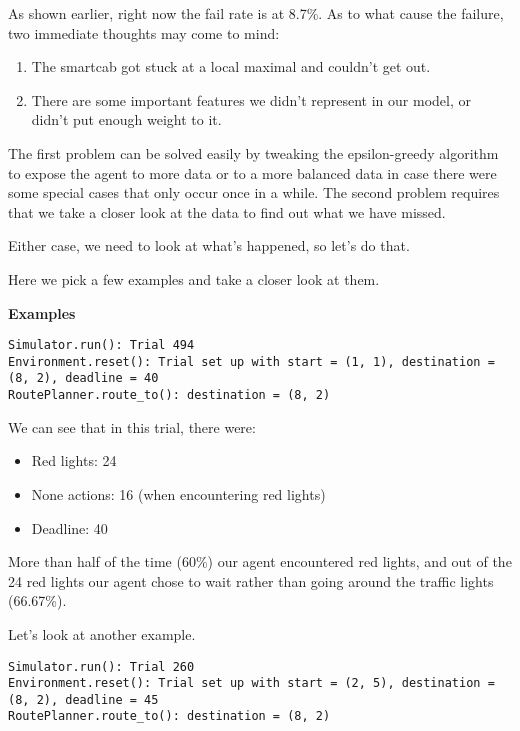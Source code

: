 \documentclass{article}
\providecommand{\tightlist}{%
      \setlength{\itemsep}{0pt}\setlength{\parskip}{0pt}}
\begin{document}
As shown earlier, right now the fail rate is at 8.7\%. As to what cause
the failure, two immediate thoughts may come to mind:

\begin{enumerate}
\def\labelenumi{\arabic{enumi}.}
\item
  The smartcab got stuck at a local maximal and couldn't get out.
\item
  There are some important features we didn't represent in our model, or
  didn't put enough weight to it.
\end{enumerate}

The first problem can be solved easily by tweaking the epsilon-greedy
algorithm to expose the agent to more data or to a more balanced data in
case there were some special cases that only occur once in a while. The
second problem requires that we take a closer look at the data to find
out what we have missed.

Either case, we need to look at what's happened, so let's do that.

Here we pick a few examples and take a closer look at them.

\textbf{Examples}

\begin{verbatim}
Simulator.run(): Trial 494
Environment.reset(): Trial set up with start = (1, 1), destination = (8, 2), deadline = 40
RoutePlanner.route_to(): destination = (8, 2)
\end{verbatim}

We can see that in this trial, there were:

\begin{itemize}
\tightlist
\item
  Red lights: 24
\item
  None actions: 16 (when encountering red lights)
\item
  Deadline: 40
\end{itemize}

More than half of the time (60\%) our agent encountered red lights, and
out of the 24 red lights our agent chose to wait rather than going
around the traffic lights (66.67\%).

Let's look at another example.

\begin{verbatim}
Simulator.run(): Trial 260
Environment.reset(): Trial set up with start = (2, 5), destination = (8, 2), deadline = 45
RoutePlanner.route_to(): destination = (8, 2)
\end{verbatim}
\end{document}
